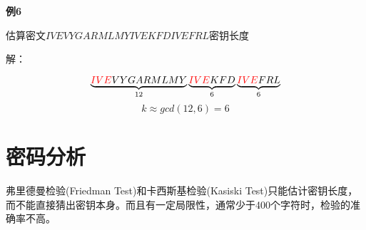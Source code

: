 \documentclass{article}
\begin{document}
\textbf{例6}

估算密文$I V E V Y G A R M L M Y I V E K F D I V E F R L$密钥长度

解：

$$ \underbrace{{\color{red}IVE}V Y G A R M L M Y }_{12}  \underbrace{{\color{red}IVE} K F D}_{6} \underbrace{{\color{red}IVE} FRL}_{6}$$
$$k \approx gcd(12,6) = 6$$


\section{密码分析}
弗里德曼检验(Friedman Test)和卡西斯基检验(Kasiski Test)只能估计密钥长度，而不能直接猜出密钥本身。而且有一定局限性，通常少于400个字符时，检验的准确率不高。
\end{document}
